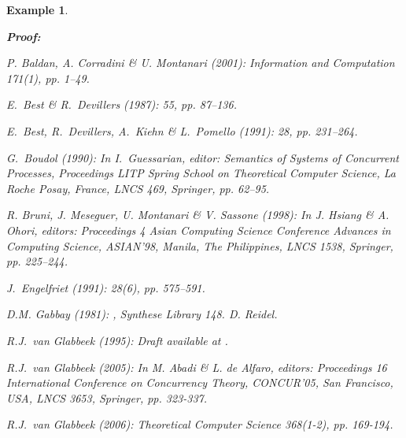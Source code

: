 \documentclass[twocolumn]{article}
\newtheorem{exam}{Example}
\newenvironment{example}[1]{\begin{exam} \rm \label{ex-#1} }{\end{exam}}
\newenvironment{proof}{\begin{trivlist} \item[\hspace{\labelsep}\bf
Proof:]}{\hfill \end{trivlist}}
\begin{document}
\begin{example}{causality}
\begin{proof}
\begin{thebibliography}{10}
\small

{\sc P. Baldan, A. Corradini \& U. Montanari} (2001):
\newblock Information and Computation 171(1), pp. 1--49.

{\sc E.~Best \& R.~Devillers} (1987):
 55, pp. 87--136.

{\sc E.~Best, R.~Devillers, A.~Kiehn \& L.~Pomello} (1991):
 28, pp. 231--264.

{\sc G.~Boudol} (1990):
\newblock In I.~Guessarian, editor: {\sl Semantics of Systems of Concurrent Processes, Proceedings LITP Spring School on Theoretical Computer Science, {\rm La Roche Posay, France}}, {\sl \rm LNCS} 469, Springer, pp. 62--95.

{\sc R. Bruni, J. Meseguer, U. Montanari \& V. Sassone} (1998):
\newblock In J. Hsiang \& A. Ohori, editors: Proceedings
4 Asian Computing Science Conference {\sl Advances in
Computing Science}, ASIAN'98, Manila,  The Philippines,
LNCS 1538, Springer, pp. 225--244.

{\sc J.~Engelfriet} (1991):
 28(6), pp. 575--591.

{\sc D.M. Gabbay} (1981):
, {\sl Synthese Library} 148.
\newblock D. Reidel.

{\sc R.J.~van Glabbeek} (1995):
\newblock Draft available at
.

{\sc R.J.~van Glabbeek} (2005):
\newblock In M. Abadi \& L. de Alfaro, editors: Proceedings 16 International Conference on {\sl Concurrency Theory}, CONCUR'05, San Francisco, USA, LNCS 3653, Springer, pp. 323-337.

{\sc R.J.~van Glabbeek} (2006):
\newblock Theoretical Computer Science 368(1-2), pp. 169-194.


\end{thebibliography}
\end{proof}
\end{example}
\end{document}
